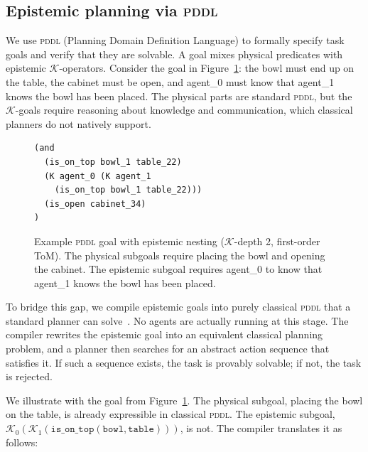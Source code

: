 \documentclass{article} %
\newcommand{\K}{\mathcal{K}}
\newcommand{\pddl}{\textsc{pddl}}
\begin{document}
\subsection{Epistemic planning via \pddl{}}
\label{sec:epistemic_pddl}

We use \pddl{} (Planning Domain Definition Language) to formally specify task goals and verify that they are solvable. A goal mixes physical predicates with epistemic $\K$-operators. Consider the goal in Figure~\ref{fig:pddl_example}: the bowl must end up on the table, the cabinet must be open, and agent\_0 must know that agent\_1 knows the bowl has been placed. The physical parts are standard \pddl{}, but the $\K$-goals require reasoning about knowledge and communication, which classical planners do not natively support.

\begin{figure}[h]
\centering
\begin{lstlisting}
(and
  (is_on_top bowl_1 table_22)
  (K agent_0 (K agent_1
    (is_on_top bowl_1 table_22)))
  (is_open cabinet_34)
)
\end{lstlisting}
\caption{Example \pddl{} goal with epistemic nesting ($\K$-depth 2, first-order ToM). The physical subgoals require placing the bowl and opening the cabinet. The epistemic subgoal requires agent\_0 to know that agent\_1 knows the bowl has been placed.}
\label{fig:pddl_example}
\end{figure}

To bridge this gap, we compile epistemic goals into purely classical \pddl{} that a standard planner can solve~\citep{muise2015planning}. No agents are actually running at this stage. The compiler rewrites the epistemic goal into an equivalent classical planning problem, and a planner then searches for an abstract action sequence that satisfies it. If such a sequence exists, the task is provably solvable; if not, the task is rejected.

We illustrate with the goal from Figure~\ref{fig:pddl_example}. The physical subgoal, placing the bowl on the table, is already expressible in classical \pddl{}. The epistemic subgoal, $\K_0(\K_1(\texttt{is\_on\_top}(\texttt{bowl}, \texttt{table})))$, is not. The compiler translates it as follows:
\end{document}
